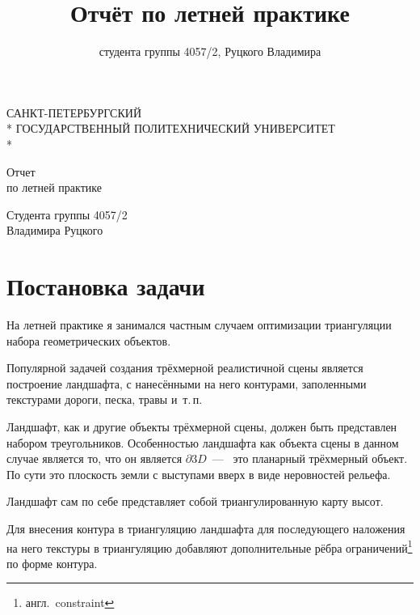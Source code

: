 \documentclass[a4paper,10pt,titlepage]{report}
\title{Отчёт по летней практике}
\author{студента группы 4057/2, Руцкого Владимира}
\date{} %
\begin{document}
\begin{titlepage}
\newpage

\begin{center}
САНКТ-ПЕТЕРБУРГСКИЙ \\*
ГОСУДАРСТВЕННЫЙ ПОЛИТЕХНИЧЕСКИЙ УНИВЕРСИТЕТ \\*
\hrulefill
\end{center}


\vspace{8em}

\begin{center}
\Large Отчет \\ по летней практике
\end{center}

\vspace{8.5em}

\begin{center}
Студента группы 4057/2 \\ Владимира Руцкого
\end{center}

\vspace{\fill}

\end{titlepage}
\pagebreak


\section*{Постановка задачи}
На летней практике я занимался частным случаем оптимизации триангуляции набора геометрических объектов.

Популярной задачей создания трёхмерной реалистичной сцены является построение ландшафта, 
с нанесёнными на него контурами, заполенными текстурами дороги, песка, травы и~т.\,п.

Ландшафт, как и другие объекты трёхмерной сцены, должен быть представлен набором треугольников.
Особенностью ландшафта как объекта сцены в данном случае является то, что он является $\partial 3D $~---~
это планарный трёхмерный объект.
По сути это плоскость земли с выступами вверх в виде неровностей рельефа.

Ландшафт сам по себе представляет собой триангулированную карту высот.

Для внесения контура в триангуляцию ландшафта для последующего наложения на него текстуры в триангуляцию
добавляют дополнительные рёбра ограничений\footnote{англ.~constraint} по форме контура.
\end{document}
